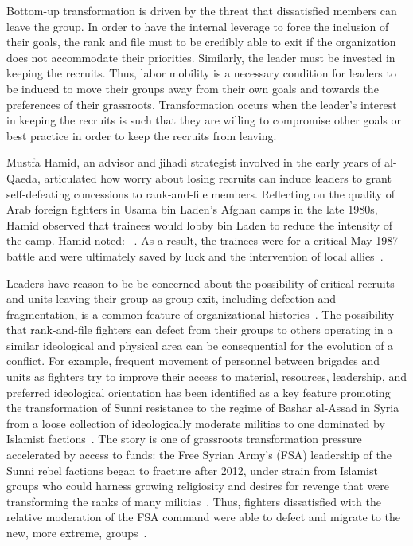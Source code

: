 Bottom-up transformation is driven by the threat that dissatisfied members can leave the group. In order to have the internal leverage to force the inclusion of their goals, the rank and file must to be credibly able to exit if the organization does not accommodate their priorities. Similarly, the leader must be invested in keeping the recruits. Thus, labor mobility is a necessary condition for leaders to be induced to move their groups away from their own goals and towards the preferences of their grassroots.  Transformation occurs when the leader's interest in keeping the recruits is such that they are willing to compromise other goals or best practice in order to keep the recruits from leaving. 

Mustfa Hamid, an advisor and jihadi strategist involved in the early years of al-Qaeda, articulated how worry about losing recruits can induce leaders to grant self-defeating concessions to rank-and-file members. Reflecting on the quality of Arab foreign fighters in Usama bin Laden's Afghan camps in the late 1980s, Hamid observed that trainees would lobby bin Laden to reduce the intensity of the camp. Hamid noted: ~\autocite[99]{hamid2015arabs}. As a result, the trainees were  for a critical May 1987 battle and were ultimately saved by luck and the intervention of local allies~\autocite[100]{hamid2015arabs}.

Leaders have reason to be be concerned about the possibility of critical recruits and units leaving their group as group exit, including defection and fragmentation, is a common feature of organizational histories~\autocite{bakke2012plague, mclauchlin2010loyalty, seymour2014factions, pearlman2012nonstate}. The possibility that rank-and-file fighters can defect from their groups to others operating in a similar ideological and physical area can be consequential for the evolution of a conflict. For example, frequent movement of personnel between brigades and units as fighters try to improve their access to material, resources, leadership, and preferred ideological orientation has been identified as a key feature promoting the transformation of Sunni resistance to the regime of Bashar al-Assad in Syria from a loose collection of ideologically moderate militias to one dominated by Islamist factions~\autocite{mironova2019freedom}. The story is one of grassroots transformation pressure accelerated by access to funds: the Free Syrian Army's (FSA) leadership of the Sunni rebel factions began to fracture after 2012, under strain from Islamist groups who could harness growing religiosity and desires for revenge that were transforming the ranks of many militias~\autocite[106]{abboud2018syria}. Thus, fighters dissatisfied with the relative moderation of the FSA command were able to defect and migrate to the new, more extreme, groups~\autocite{abboud2018syria}.  %

